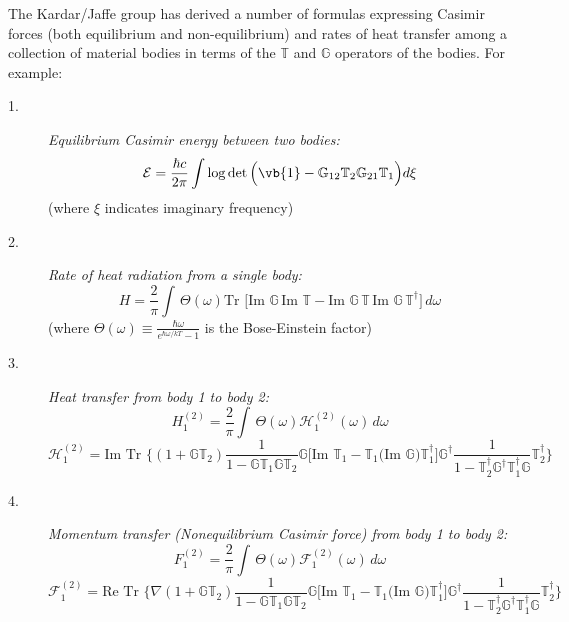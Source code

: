 \documentclass[letterpaper]{article}
\newcommand{\TT}{\mathbb{T}}
\newcommand{\GG}{\mathbb{G}}
\newcommand{\im}{\text{Im }}
\begin{document}
The Kardar/Jaffe group has derived a number of formulas expressing
Casimir forces (both equilibrium and non-equilibrium) and
rates of heat transfer among a collection of material bodies 
in terms of the $\TT$ and $\GG$ operators of the
bodies. For example:
\begin{description}
 \item[1.] \textit{Equilibrium Casimir energy between two bodies:}
 $$\mathcal{E}=\frac{\hbar c}{2\pi}\int
   \log\det\Big(\vb{1} - \GG_{12}\mathbb{T}_2\GG_{21}\mathbb{T}_1\Big)
   d\xi
 $$
(where $\xi$ indicates imaginary frequency)
 \item[2.] \textit{Rate of heat radiation from a single body:}
 $$H=\frac{2}{\pi}
   \int \,\Theta(\omega) 
   \text{Tr }
   \Big[   \text{Im }\GG \, \text{Im }\TT 
         - \text{Im }\GG \, \TT \,
           \text{Im }\GG\, \TT^\dagger 
   \Big] \, d\omega
 $$
(where $\Theta(\omega)\equiv \frac{\hbar\omega}{e^{\hbar\omega/kT} - 1}$
 is the Bose-Einstein factor)
 \item[3.] \textit{Heat transfer from body 1 to body 2:}
 $$H_1^{(2)}=\frac{2}{\pi}
   \int \,\Theta(\omega) \mathcal{H}_1^{(2)}(\omega)\,d\omega
 $$
 $$\mathcal{H}_1^{(2)}=\text{Im Tr }
   \bigg\{ (1 + \GG \TT_2) \frac{1}{1-\GG \TT_1 \GG \TT_2}
           \GG 
           \Big[ \im \TT_1 - \TT_1 \big(\im \GG\big) \TT_1^\dagger \Big] 
           \GG^\dagger
           \frac{1}{1-\TT_2^\dagger \GG^\dagger \TT_1^\dagger \GG}\TT_2^\dagger
   \bigg\}
 $$
 \item[4.] \textit{Momentum transfer (Nonequilibrium Casimir force) from body 1 to body 2:}
 $$F_1^{(2)}=\frac{2}{\pi}
   \int \,\Theta(\omega) \mathcal{F}_1^{(2)}(\omega)\,d\omega
 $$
 $$\mathcal{F}_1^{(2)}=\text{Re Tr }
   \bigg\{ \nabla (1 + \GG \TT_2) 
           \frac{1}{1-\GG \TT_1 \GG \TT_2}
           \GG 
           \Big[ \im \TT_1 - \TT_1 \big(\im \GG\big) \TT_1^\dagger \Big] 
           \GG^\dagger
           \frac{1}{1-\TT_2^\dagger \GG^\dagger \TT_1^\dagger \GG}
           \TT_2^\dagger
   \bigg\}
 $$
\end{description}
\end{document}
